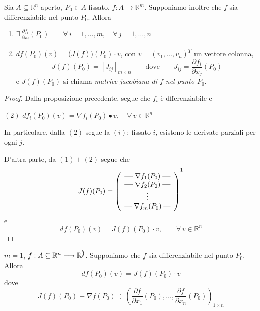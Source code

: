 \begin{cor}
Sia $A \subseteq \mathbb{R}^n$ aperto, $P_0 \in A$ fissato, $f : A \longrightarrow \mathbb{R}^m$. Supponiamo inoltre che $f$ sia differenziabile nel punto $P_0$. Allora
\begin{enumerate}[labelindent=\parindent,leftmargin=*,label=\textnormal{(\roman*)},start=1]
\item $\displaystyle \exists \, \frac{\partial f_i}{\partial x_j} (P_0) \qquad \forall \, i=1,\ldots,m, \quad \forall \, j = 1,\ldots,n$
\item $df(P_0)(v) = \Big(J(f)\Big)(P_0) \cdot v$, con $v=(v_1,\ldots,v_n)^T$ un vettore colonna,
$$
J(f)(P_0) = \left[ J_{ij} \right]_{m \times n} \qquad \text{dove} \qquad J_{ij} = \frac{\partial f_i}{\partial x_j} (P_0)
$$
e $J(f)(P_0)$ si chiama \emph{matrice jacobiana di $f$ nel punto $P_0$}.
\end{enumerate}
\end{cor}
\begin{proof}
Dalla proposizione precedente, segue che $f_i$ è dfferenziabile e 
\begin{center}
$\mathrm{(2)}$
\hfill
$\displaystyle df_i(P_0)(v) = \nabla f_i(P_0) \bullet v, \quad \forall \, v \in \mathbb{R}^n$
\hfill \null \\
\end{center}
In particolare, dalla $(2)$ segue la $(i)$: fissato $i$, esistono le derivate parziali per ogni $j$.

D'altra parte, da $(1)+(2)$ segue che
$$
J(f)(P_0) = \left(
\begin{array}{c}
\Rigaln{\nabla f_1 (P_0)}\\
\Rigaln{\nabla f_2 (P_0)}\\
\vdots\\
\Rigaln{\nabla f_m (P_0)}\\
\end{array} \right)
^{\footnotemark}
$$
e
$$
df(P_0)(v) = J(f)(P_0) \cdot v, \qquad \forall \, v \in \mathbb{R}^n
$$
\end{proof}

\begin{example}
$m=1$, $f : A \subseteq \mathbb{R}^n \longrightarrow \mathbb{R}^{\xcancel{1}}$. Supponiamo che $f$ sia differenziabile nel punto $P_0$. Allora
$$
df(P_0)(v) = J(f)(P_0) \cdot v
$$
dove
$$
J(f)(P_0) \equiv \nabla f(P_0) \doteqdot \left( \frac{\partial f}{\partial x_1}(P_0), \ldots ,\frac{\partial f}{\partial x_n}(P_0) \right)_{1 \times n}
$$
\end{example}

